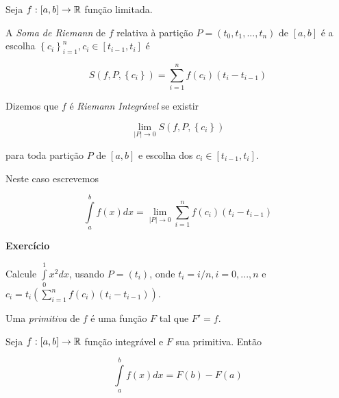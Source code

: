 \documentclass{book}
\begin{document}
\begin{defn}
Seja $f:\left[ {a,b} \right] \to \mathbb{R}$ fun\c c\~ao limitada.

A \textit{Soma de Riemann} de $f$ relativa \`a parti\c c\~ao $P = \left( {t_0 ,t_1 ,...,t_n } \right)$ de $\left[ {a,b} \right]$ \'e a escolha $\left\{ {c_i } \right\}_{i = 1}^n ,c_i  \in \left[ {t_{i - 1} ,t_i } \right]$ \'e

\[\boxed{
    S\left( {f,P,\left\{ {c_i } \right\}} \right) = \sum\limits_{i = 1}^n {f\left( {c_i } \right)\left( {t_i  - t_{i - 1} } \right)}}
\]

\end{defn}

\begin{defn}
Dizemos que $f$ \'e \textit{Riemann Integr\'avel} se existir

\[
    \mathop {\lim }\limits_{\left| P \right| \to 0} S\left( {f,P,\left\{ {c_i } \right\}} \right)
\]

    para toda parti\c c\~ao $P$ de $\left[ {a,b} \right]$ e escolha dos $c_i  \in \left[ {t_{i - 1} ,t_i } \right]$.

Neste caso escrevemos

\[
    \int\limits_a^b {f\left( x \right)dx}  = \mathop {\lim }\limits_{\left| P \right| \to 0} \sum\limits_{i = 1}^n {f\left( {c_i } \right)\left( {t_i  - t_{i - 1} } \right)}
\]

\end{defn}

\textbf{Exerc\'icio}

\begin{exerc}
\begin{sloppypar}
 Calcule $\int\limits_0^1 {x^2 dx}$, usando $P = \left( {t_i } \right)$, onde $t_i  = i/n,i = 0,...,n$ e ${c_i  = t_i \left( {\sum\limits_{i = 1}^n {f\left( {c_i } \right)\left( {t_i  - t_{i - 1} } \right)} } \right)}$.
\end{sloppypar}
\end{exerc}

\begin{defn}
Uma \textit{primitiva} de $f$ \'e uma fun\c c\~ao $F$ tal que $F' = f$.
\end{defn}

\begin{teo} \label{tfc}
Seja $f:\left[ {a,b} \right] \to \mathbb{R}$ fun\c c\~ao integr\'avel e $F$ sua primitiva. Ent\~ao

\[\boxed{
    \int\limits_a^b {f\left( x \right)dx}  = F\left( b \right) - F\left( a \right)}
\]

\end{teo}
\end{document}
